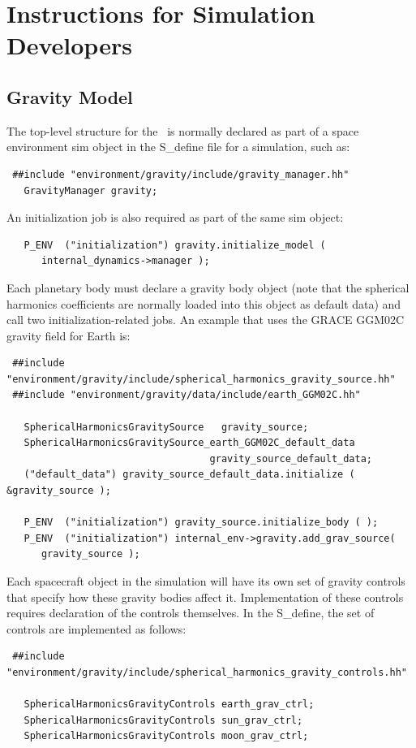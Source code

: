 \section{Instructions for Simulation Developers}

\subsection{Gravity Model}
The top-level structure for the \ModelDesc\ is normally declared as part of a
space environment sim object in the S\_define file for a simulation, such as:
\begin{verbatim}
 ##include "environment/gravity/include/gravity_manager.hh"
   GravityManager gravity;
\end{verbatim}

An initialization job is also required as part of the same sim object: 
\begin{verbatim}
   P_ENV  ("initialization") gravity.initialize_model (
      internal_dynamics->manager );
\end{verbatim}

Each planetary body must declare a gravity body object (note that the spherical
harmonics coefficients are normally loaded into this object as default data) and
call two initialization-related jobs. An example that uses the GRACE GGM02C
gravity field for Earth is:
\begin{verbatim}
 ##include "environment/gravity/include/spherical_harmonics_gravity_source.hh"
 ##include "environment/gravity/data/include/earth_GGM02C.hh"

   SphericalHarmonicsGravitySource   gravity_source;
   SphericalHarmonicsGravitySource_earth_GGM02C_default_data
                                   gravity_source_default_data;
   ("default_data") gravity_source_default_data.initialize ( &gravity_source );

   P_ENV  ("initialization") gravity_source.initialize_body ( );
   P_ENV  ("initialization") internal_env->gravity.add_grav_source(
      gravity_source );
\end{verbatim}

Each spacecraft object in the simulation will have its own set of gravity
controls that specify how these gravity bodies affect it. Implementation of
these controls requires declaration of the controls themselves. In the
S\_define, the set of controls are implemented as follows:
\begin{verbatim}
 ##include "environment/gravity/include/spherical_harmonics_gravity_controls.hh"

   SphericalHarmonicsGravityControls earth_grav_ctrl;
   SphericalHarmonicsGravityControls sun_grav_ctrl;
   SphericalHarmonicsGravityControls moon_grav_ctrl;
\end{verbatim}

